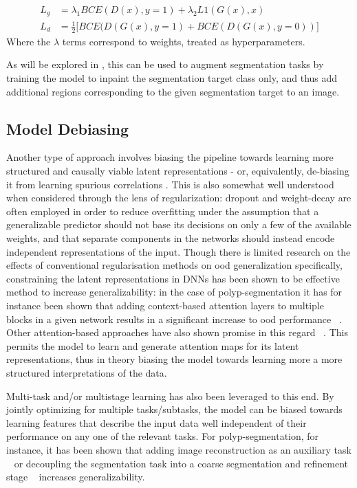      \begin{align}
    L_g &= \lambda_1 BCE(D(x),y=1) + \lambda_2 L1(G(x), x) \\
    L_d &= \frac{1}{2}\big[ BCE(D(G(x),y=1)+BCE(D(G(x), y=0)) \big]
    \end{align}
    Where the \(\lambda\) terms correspond to weights, treated as hyperparameters. 
     
    As will be explored in , this can be used to augment segmentation tasks by training the model to inpaint the segmentation target class only, and thus add additional regions corresponding to the given segmentation target to an image.

\subsection{Model Debiasing}
Another type of approach involves biasing the pipeline towards learning more structured and causally viable latent representations - or, equivalently, de-biasing it from learning spurious correlations \cite{generalization_datamod}. This is also somewhat well understood when considered through the lens of regularization: dropout \cite{dropout} and weight-decay \cite{weight_decay} are often employed in order to reduce overfitting under the assumption that a generalizable predictor should not base its decisions on only a few of the available weights, and that separate components in the networks should instead encode independent representations of the input. Though there is limited research on the effects of conventional regularisation methods on \gls{ood} generalization specifically, constraining the latent representations in DNNs has been shown to be effective method to increase generalizability: in the case of polyp-segmentation it has for instance been shown that adding context-based attention layers to multiple blocks in a given network results in a significant increase to \gls{ood} performance ~\cite{uacanet}. Other attention-based approaches have also shown promise in this regard ~\cite{attention_generalizability, reverse_attention}. This permits the model to learn and generate attention maps for its latent representations, thus in theory biasing the model towards learning more a more structured interpretations of the data. 

Multi-task and/or multistage learning has also been leveraged to this end. By jointly optimizing for multiple tasks/subtasks, the model can be biased towards learning features that describe the input data well independent of their performance on any one of the relevant tasks. For polyp-segmentation, for instance, it has been shown that adding image reconstruction as an auxiliary task ~\cite{ddanet} or decoupling the segmentation task into a coarse segmentation and refinement stage ~\cite{doubleencdec} increases generalizability. 

